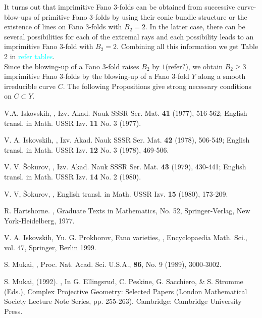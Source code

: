 \documentclass[11pt]{amsart}
\theoremstyle{plain}
\theoremstyle{definition}
\theoremstyle{expl}
\begin{document}
    \noindent  
    It turns out that imprimitive Fano $3$-folds can be obtained from successive curve-blow-ups of primitive Fano $3$-folds by using their conic bundle structure or the existence of lines on Fano $3$-folds with $B_2=2$. In the latter case, there can be several possibilities for each of the extremal rays and each possibility leads to an imprimitive Fano $3$-fold with $B_2=2$. Combining all this information we get Table 2 in \textcolor{cyan}{refer tables}.\\
    \noindent Since the blowing-up of a Fano $3$-fold raises $B_2$ by $1$(refer?), we obtain $B_2 \geq 3$ imprimitive Fano $3$-folds by the blowing-up of a Fano $3$-fold $Y$ along a smooth irreducible curve $C$. The following Propositions give strong necessary conditions on $C \subset Y$.
    

\begin{thebibliography}{12}
V.A. Iskovskih, 
,
\newblock Izv. Akad. Nauk SSSR Ser. Mat.  \textbf{41} (1977), 516-562; English transl. in Math. USSR Izv. \textbf{11} No. 3 (1977).

V. A. Iskovskih, 
, 
\newblock Izv. Akad. Nauk SSSR Ser. Mat.
\textbf{42} (1978), 506-549; English transl. in Math. USSR Izv. \textbf{12} No. 3 (1978), 469-506.

V. V. \v{S}okurov, 
,
\newblock Izv. Akad. Nauk SSSR Ser. Mat. \textbf{43} (1979), 430-441; English transl. in Math. USSR Izv. \textbf{14} No. 2 (1980).

V. V, \v{S}okurov, 
,
\newblock English transl. in Math. USSR Izv. \textbf{15} (1980), 173-209.

R. Hartshorne.
,
\newblock Graduate Texts in Mathematics, No. 52, Springer-Verlag, New York-Heidelberg, 1977.
	
V. A. Iskovskih, Yu. G. Prokhorov, Fano varieties,
,
\newblock Encyclopaedia Math. Sci., vol. 47, Springer, Berlin 1999.

S. Mukai,
,
\newblock Proc. Nat. Acad. Sci. U.S.A., \textbf{86}, No. 9 (1989), 3000-3002.

S. Mukai, (1992). 
,
\newblock In G. Ellingsrud, C. Peskine, G. Sacchiero, \& S. Stromme (Eds.), Complex Projective Geometry: Selected Papers (London Mathematical Society Lecture Note Series, pp. 255-263). Cambridge: Cambridge University Press. 


\end{thebibliography}
\end{document}
